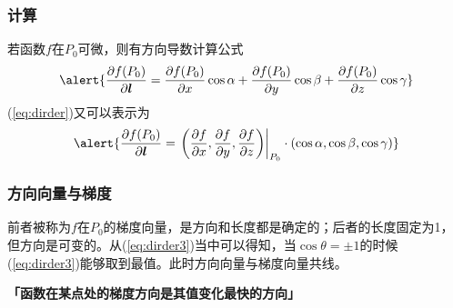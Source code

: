 \begin{frame}
    \frametitle{计算}

    若函数$f$在$P_0$可微，则有方向导数计算公式\pause
    \begin{equation}
        \alert{\frac{\partial f(P_0)}{\partial \boldsymbol{l}}=\frac{\partial f(P_0)}{\partial x}\cos\alpha+\frac{\partial f(P_0)}{\partial y}\cos\beta+\frac{\partial f(P_0)}{\partial z}\cos\gamma}\label{eq:dirder}
    \end{equation}\pause
    (\ref{eq:dirder})又可以表示为\pause
    \begin{equation}
        \alert{\frac{\partial f(P_0)}{\partial \boldsymbol{l}}=\left.\left(\frac{\partial f}{\partial x},\frac{\partial f}{\partial y},\frac{\partial f}{\partial z}\right)\right|_{P_0}\cdot\left(\cos\alpha,\cos\beta,\cos\gamma\right)}\label{eq:dirder2}
    \end{equation}

\end{frame}


\begin{frame}
    \frametitle{方向向量与梯度}

    前者被称为$f$在$P_0$的梯度向量，是方向和长度都是确定的；后者的长度固定为1，但方向是可变的。从(\ref{eq:dirder3})当中可以得知，当$\cos\theta=\pm 1$的时候(\ref{eq:dirder3})能够取到最值。此时方向向量与梯度向量共线。\pause

    \vfill

    \begin{center}
        \textbf{「函数在某点处的梯度方向是其值变化最快的方向」}
    \end{center}\vfill

\end{frame}


